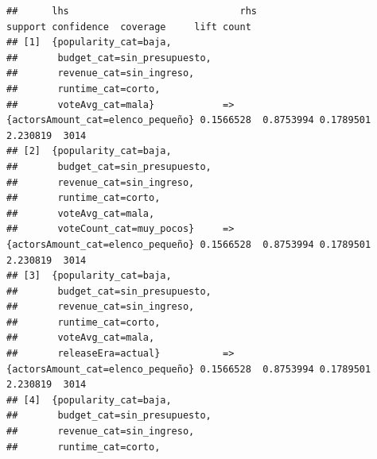 \documentclass[
]{article}
\begin{document}
\begin{verbatim}
##      lhs                              rhs                                 support confidence  coverage     lift count
## [1]  {popularity_cat=baja,                                                                                           
##       budget_cat=sin_presupuesto,                                                                                    
##       revenue_cat=sin_ingreso,                                                                                       
##       runtime_cat=corto,                                                                                             
##       voteAvg_cat=mala}            => {actorsAmount_cat=elenco_pequeño} 0.1566528  0.8753994 0.1789501 2.230819  3014
## [2]  {popularity_cat=baja,                                                                                           
##       budget_cat=sin_presupuesto,                                                                                    
##       revenue_cat=sin_ingreso,                                                                                       
##       runtime_cat=corto,                                                                                             
##       voteAvg_cat=mala,                                                                                              
##       voteCount_cat=muy_pocos}     => {actorsAmount_cat=elenco_pequeño} 0.1566528  0.8753994 0.1789501 2.230819  3014
## [3]  {popularity_cat=baja,                                                                                           
##       budget_cat=sin_presupuesto,                                                                                    
##       revenue_cat=sin_ingreso,                                                                                       
##       runtime_cat=corto,                                                                                             
##       voteAvg_cat=mala,                                                                                              
##       releaseEra=actual}           => {actorsAmount_cat=elenco_pequeño} 0.1566528  0.8753994 0.1789501 2.230819  3014
## [4]  {popularity_cat=baja,                                                                                           
##       budget_cat=sin_presupuesto,                                                                                    
##       revenue_cat=sin_ingreso,                                                                                       
##       runtime_cat=corto,                                                                                             

\end{verbatim}
\end{document}
